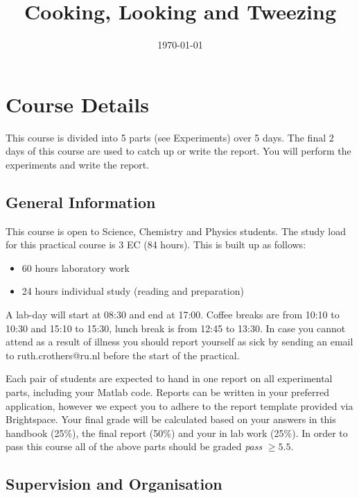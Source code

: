 \documentclass[12pt,a4paper,twoside]{article}
\begin{document}
\title{Cooking, Looking and Tweezing}
\date{\today}

\maketitle

\newpage


\section{Course Details}

This course is divided into 5 parts (see Experiments) over 5 days. The final 2 days of this course are used to catch up or write the report. You will perform the experiments and write the report.

\subsection{General Information}

This course is open to Science, Chemistry and Physics students. The study load for this practical course is 3 EC (84 hours). This is built up as follows:

\begin{itemize}
    \item 60 hours laboratory work
    \item 24 hours individual study (reading and preparation)
\end{itemize}

A lab-day will start at 08:30 and end at 17:00. Coffee breaks are from 10:10 to 10:30 and 15:10 to 15:30, lunch break is from 12:45 to 13:30. In case you cannot attend as a result of illness you should report yourself as sick by sending an email to ruth.crothers@ru.nl before the start of the practical.

Each pair of students are expected to hand in one report on all experimental parts, including your Matlab code. Reports can be written in your preferred application, however we expect you to adhere to the report template provided via Brightspace. Your final grade will be calculated based on your answers in this handbook (25\%), the final report (50\%) and your in lab work (25\%). In order to pass this course all of the above parts should be graded \emph{pass} $\geq 5.5$.


\subsection{Supervision and Organisation}
\end{document}
